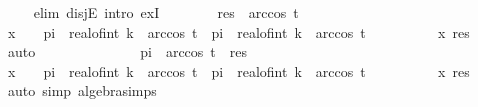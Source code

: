 \begin{isabellebody}
\ \ \ \ \isamarkupfalse%
{\isacharparenleft}{\kern0pt}elim\ disjE{\isacharsemicolon}{\kern0pt}\ intro\ exI{\isacharparenright}{\kern0pt}\isanewline
\ \ \ \ \ \ \isamarkupfalse%
\ {\isachardoublequoteopen}res\ {\isasymle}\ arccos\ t{\isachardoublequoteclose}\isanewline
\ \ \ \ \ \ \isamarkupfalse%
\ \isamarkupfalse%
\ {\isachardoublequoteopen}x\ {\isasymin}\ {\isacharbraceleft}{\kern0pt}{}\ {\isacharasterisk}{\kern0pt}\ pi\ {\isacharasterisk}{\kern0pt}\ real{\isacharunderscore}{\kern0pt}of{\isacharunderscore}{\kern0pt}int\ k\ {\isacharminus}{\kern0pt}\ arccos\ t{\isachardot}{\kern0pt}{\isachardot}{\kern0pt}{}\ {\isacharasterisk}{\kern0pt}\ pi\ {\isacharasterisk}{\kern0pt}\ real{\isacharunderscore}{\kern0pt}of{\isacharunderscore}{\kern0pt}int\ k\ {\isacharplus}{\kern0pt}\ arccos\ t{\isacharbraceright}{\kern0pt}{\isachardoublequoteclose}\isanewline
\ \ \ \ \ \ \ \ \isamarkupfalse%
\ x\ res\ \isamarkupfalse%
\ auto\isanewline
\ \ \ \ \isamarkupfalse%
\isanewline
\ \ \ \ \ \ \isamarkupfalse%
\ {\isachardoublequoteopen}{}\ {\isacharasterisk}{\kern0pt}\ pi\ {\isacharminus}{\kern0pt}\ arccos\ t\ {\isasymle}\ res{\isachardoublequoteclose}\isanewline
\ \ \ \ \ \ \isamarkupfalse%
\ \isamarkupfalse%
\ {\isachardoublequoteopen}x\ {\isasymin}\ {\isacharbraceleft}{\kern0pt}{}\ {\isacharasterisk}{\kern0pt}\ pi\ {\isacharasterisk}{\kern0pt}\ real{\isacharunderscore}{\kern0pt}of{\isacharunderscore}{\kern0pt}int\ {\isacharparenleft}{\kern0pt}k{\isacharplus}{\kern0pt}{}{\isacharparenright}{\kern0pt}\ {\isacharminus}{\kern0pt}\ arccos\ t{\isachardot}{\kern0pt}{\isachardot}{\kern0pt}{}\ {\isacharasterisk}{\kern0pt}\ pi\ {\isacharasterisk}{\kern0pt}\ real{\isacharunderscore}{\kern0pt}of{\isacharunderscore}{\kern0pt}int\ {\isacharparenleft}{\kern0pt}k{\isacharplus}{\kern0pt}{}{\isacharparenright}{\kern0pt}\ {\isacharplus}{\kern0pt}\ arccos\ t{\isacharbraceright}{\kern0pt}{\isachardoublequoteclose}\isanewline
\ \ \ \ \ \ \ \ \isamarkupfalse%
\ x\ res\ \isamarkupfalse%
\ {\isacharparenleft}{\kern0pt}auto\ simp{\isacharcolon}{\kern0pt}\ algebra{\isacharunderscore}{\kern0pt}simps{\isacharparenright}{\kern0pt}\isanewline
\ \ \ \ \isamarkupfalse%
\isanewline
\ \ \isamarkupfalse%
\isanewline
\ \ \isamarkupfalse%

\end{isabellebody}
